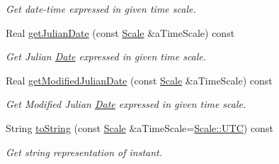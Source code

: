 \begin{DoxyCompactItemize}
\begin{DoxyCompactList}\small\item\em Get date-\/time expressed in given time scale. \end{DoxyCompactList}\item 
Real \hyperlink{classostk_1_1physics_1_1time_1_1_instant_a71b3a5992123fddb3a3539dc99df66c1}{get\+Julian\+Date} (const \hyperlink{namespaceostk_1_1physics_1_1time_adf23d37bd8641fb76a0e98ab46a70df7}{Scale} \&a\+Time\+Scale) const
\begin{DoxyCompactList}\small\item\em Get Julian \hyperlink{classostk_1_1physics_1_1time_1_1_date}{Date} expressed in given time scale. \end{DoxyCompactList}\item 
Real \hyperlink{classostk_1_1physics_1_1time_1_1_instant_aeaaf152c806c5f98ad03933ede05fe2d}{get\+Modified\+Julian\+Date} (const \hyperlink{namespaceostk_1_1physics_1_1time_adf23d37bd8641fb76a0e98ab46a70df7}{Scale} \&a\+Time\+Scale) const
\begin{DoxyCompactList}\small\item\em Get Modified Julian \hyperlink{classostk_1_1physics_1_1time_1_1_date}{Date} expressed in given time scale. \end{DoxyCompactList}\item 
String \hyperlink{classostk_1_1physics_1_1time_1_1_instant_a710ff6dec3b97f4e10bcfeae6335eb56}{to\+String} (const \hyperlink{namespaceostk_1_1physics_1_1time_adf23d37bd8641fb76a0e98ab46a70df7}{Scale} \&a\+Time\+Scale=\hyperlink{namespaceostk_1_1physics_1_1time_adf23d37bd8641fb76a0e98ab46a70df7a9234324ddf6b4176b57d803a925b7961}{Scale\+::\+U\+TC}) const
\begin{DoxyCompactList}\small\item\em Get string representation of instant. \end{DoxyCompactList}\end{DoxyCompactItemize}
